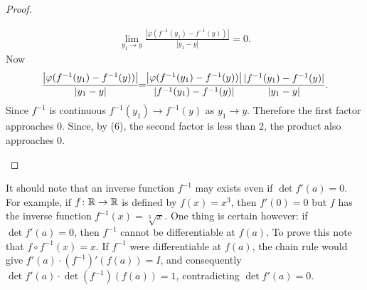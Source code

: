 \begin{proof}
\begin{enumerate}[label={\textup{\arabic*.\,}}]
\begin{align*}
                \lim_{y_1\to y}\frac{\left|\varphi(f^{-1}(y_1)-f^{-1}(y))\right|}{|y_1-y|}=0.
            \end{align*}
            Now 
            \begin{align*}
                \frac{\left|\varphi(f^{-1}(y_1)-f^{-1}(y))\right|}{|y_1-y|}
                \hspace*{-4pt}=\hspace*{-4pt} 
                \frac{\left|\varphi(f^{-1}(y_1)-f^{-1}(y))\right|}{|f^{-1}(y_1) - f^{-1}(y)|}
                \hspace*{-4pt}\cdot\hspace*{-4pt} 
                \frac{|f^{-1}(y_1) - f^{-1}(y)|}{|y_1-y|}. 
            \end{align*}
            Since $f^{-1}$ is continuous $f^{-1}(y_1) \to f^{-1}(y)$ as $y_1\to y$. Therefore 
            the first factor approaches 0. Since, by (6), the second factor is less than 2, 
            the product also approaches 0.
    \end{enumerate}
\end{proof}

It should note that an inverse function $f^{-1}$ may exists even if $\det f'(a) = 0$. 
For example, if $f\colon{}\mathbb{R}\to \mathbb{R}$ is defined by $f(x) = x^3$, then $f'(0) = 0$ but $f$
has the inverse function $f^{-1}(x) = \sqrt[3]{x}$. One thing is certain however: if 
$\det f'(a) = 0$, then $f^{-1}$ cannot be differentiable at $f(a)$. To prove this note 
that $f\circ f^{-1}(x) = x$. If $f^{-1}$ were differentiable at $f(a)$, the chain rule 
would give $f'(a)\cdot (f^{-1})'(f(a)) = I$, and consequently $\det f'(a)\cdot \det(f^{-1})(f(a)) = 1$,
contradicting $\det f'(a) = 0$.

